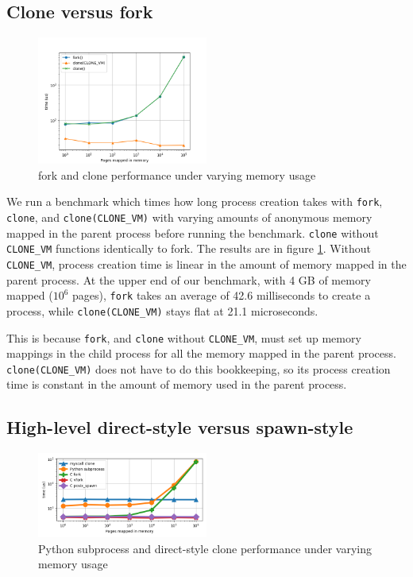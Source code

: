 \documentclass[sigplan]{acmart}
\begin{document}
\subsection{Clone versus fork}\label{microbench}
\begin{figure}[h!]
\centering
 \includegraphics[width=0.5\textwidth]{microbench}
 \caption{fork and clone performance under varying memory usage}
 \label{fig:microbench}
\end{figure}

We run a benchmark which times how long process creation takes
with \texttt{fork}, \texttt{clone}, and \verb|clone(CLONE_VM)|
with varying amounts of anonymous memory mapped in the parent process
before running the benchmark.
\texttt{clone} without \verb|CLONE_VM| functions identically to fork.
The results are in figure \ref{fig:microbench}.
Without \verb|CLONE_VM|,
process creation time is linear in the amount of memory mapped in the parent process.
At the upper end of our benchmark, with 4 GB of memory mapped ($10^6$ pages),
\texttt{fork} takes an average of 42.6 milliseconds to create a process,
while \verb|clone(CLONE_VM)| stays flat at 21.1 microseconds.

This is because \texttt{fork}, and \texttt{clone} without \verb|CLONE_VM|,
must set up memory mappings in the child process for all the memory mapped in the parent process.
\verb|clone(CLONE_VM)| does not have to do this bookkeeping,
so its process creation time is constant in the amount of memory used in the parent process.

\subsection{High-level direct-style versus spawn-style}\label{subprocess_bench}
\begin{figure}[h!]
\centering
 \includegraphics[width=0.5\textwidth]{subprocess_bench}
 \caption{Python subprocess and direct-style clone performance under varying memory usage}
 \label{fig:subprocess_bench}
\end{figure}
\end{document}
